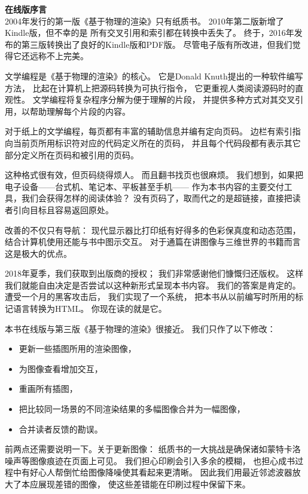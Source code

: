 {\Huge\bfseries 在线版序言}\vspace{30pt}\\

2004年发行的第一版《基于物理的渲染》只有纸质书。
2010年第二版新增了Kindle版，但不幸的是
所有交叉引用和索引都在转换中丢失了。
终于，2016年发布的第三版转换出了良好的Kindle版和PDF版。
尽管电子版有所改进，但我们觉得它还远称不上完美。

文学编程是《基于物理的渲染》的核心。
它是Donald Knuth提出的一种软件编写方法，
比起在计算机上把源码转换为可执行指令，
它更重视人类阅读源码时的直观性。
文学编程将复杂程序分解为便于理解的片段，
并提供多种方式对其交叉引用，以帮助理解每个片段的内容。

对于纸上的文学编程，每页都有丰富的辅助信息并编有定向页码。
边栏有索引指向当前页所用标识符对应的代码定义所在的页码，
并且每个代码段都有表示其它部分定义所在页码和被引用的页码。

这种格式很有效，但页码绕得烦人。
而且翻书找页也很麻烦。
我们想到，如果把电子设备——台式机、笔记本、平板甚至手机——
作为本书内容的主要交付工具，我们会获得怎样的阅读体验？
没有页码了，取而代之的是超链接，直接把读者引向目标且容易返回原处。

改善的不仅只有导航：
现代显示器比打印纸有好得多的色彩保真度和动态范围，
结合计算机使用还能与书中图示交互。
对于通篇在讲图像与三维世界的书籍而言这是极大的优点。

2018年夏季，我们获取到出版商的授权；
我们非常感谢他们慷慨归还版权。
这样我们就能自由决定是否尝试以这种新形式呈现本书内容。
我们的答案是肯定的。
遭受一个月的黑客攻击后，
我们实现了一个系统，
把本书从以前编写时所用的标记语言转换为HTML。
你现在读的就是它。

本书在线版与第三版《基于物理的渲染》很接近。
我们只作了以下修改：
\begin{itemize}
    \item 更新一些插图所用的渲染图像，
    \item 为图像查看增加交互，
    \item 重画所有插图，
    \item 把比较同一场景的不同渲染结果的多幅图像合并为一幅图像，
    \item 合并读者反馈的勘误。
\end{itemize}

前两点还需要说明一下。关于更新图像：
纸质书的一大挑战是确保诸如蒙特卡洛噪声等图像痕迹在页面上可见。
我们担心印刷会引入多余的模糊，
也担心成书过程中有好心人帮倒忙给图像降噪使其看起来更清晰。
因此我们用最近邻滤波器放大了本应展现差错的图像，
使这些差错能在印刷过程中保留下来。

